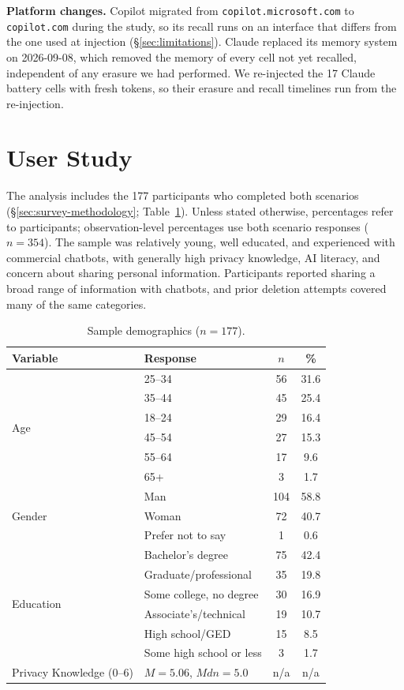 \documentclass[conference,compsoc]{IEEEtran}
\begin{document}
\textbf{Platform changes.} Copilot migrated from \texttt{copilot.microsoft.com}
to \texttt{copilot.com} during the study, so its recall runs on an interface
that differs from the one used at injection (\S\ref{sec:limitations}). Claude
replaced its memory system on 2026-09-08, which removed the memory of every
cell not yet recalled, independent of any erasure we had performed. We
re-injected the 17 Claude battery cells with fresh tokens, so their erasure
and recall timelines run from the re-injection.

\section{User Study}

\label{sec:sample-knowledge}

The analysis includes the 177 participants who completed both scenarios (\S\ref{sec:survey-methodology}; Table~\ref{tab:demographics}). Unless stated otherwise, percentages refer to participants; observation-level percentages use both scenario responses ($n=354$). The sample was relatively young, well educated, and experienced with commercial chatbots, with generally high privacy knowledge, AI literacy, and concern about sharing personal information. Participants reported sharing a broad range of information with chatbots, and prior deletion attempts covered many of the same categories.

\begin{table}[t]
\centering
\caption{Sample demographics ($n=177$).}
\label{tab:demographics}
\small
\setlength{\tabcolsep}{3.5pt}
\begin{tabular}{llcc}
\toprule
Variable & Response & $n$ & \% \\
\midrule
\multirow{6}{*}{Age}
 & 25--34 & 56 & 31.6 \\
 & 35--44 & 45 & 25.4 \\
 & 18--24 & 29 & 16.4 \\
 & 45--54 & 27 & 15.3 \\
 & 55--64 & 17 & 9.6 \\
 & 65+    & 3  & 1.7 \\
\midrule
\multirow{3}{*}{Gender}
 & Man               & 104 & 58.8 \\
 & Woman             & 72  & 40.7 \\
 & Prefer not to say & 1   & 0.6 \\
\midrule
\multirow{6}{*}{Education}
 & Bachelor's degree      & 75 & 42.4 \\
 & Graduate/professional  & 35 & 19.8 \\
 & Some college, no degree & 30 & 16.9 \\
 & Associate's/technical  & 19 & 10.7 \\
 & High school/GED        & 15 & 8.5 \\
 & Some high school or less & 3 & 1.7 \\
\midrule
Privacy Knowledge (0--6) & $M=5.06$, $Mdn=5.0$ & n/a & n/a \\
\bottomrule
\end{tabular}
\end{table}
\end{document}
